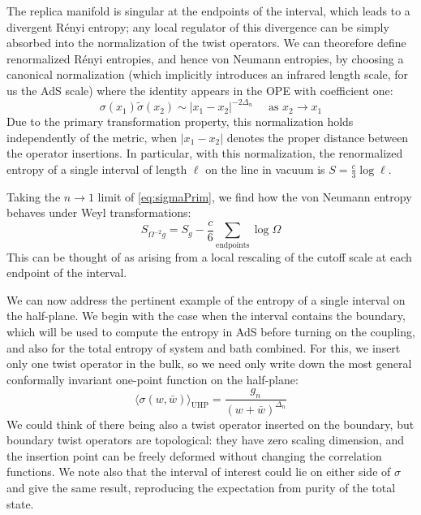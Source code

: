 \documentclass[12pt]{article}
\begin{document}
The replica manifold is singular at the endpoints of the interval, which leads to a divergent R\'enyi entropy; any local regulator of this divergence can be simply absorbed into the normalization of the twist operators. We can theorefore define renormalized R\'enyi entropies, and hence von Neumann entropies, by choosing a canonical normalization (which implicitly introduces an infrared length scale, for us the AdS scale) where the identity appears in the OPE with coefficient one:
\begin{equation}
	\sigma(x_1)\tilde{\sigma}(x_2)\sim |x_1-x_2|^{-2\Delta_n} \quad\text{ as } x_2\to x_1
\end{equation}
Due to the primary transformation property, this normalization holds independently of the metric, when $|x_1-x_2|$ denotes the proper distance between the operator insertions. In particular, with this normalization, the renormalized entropy of a single interval of length $\ell$ on the line in vacuum is $S=\frac{c}{3}\log \ell$.

Taking the $n\to 1$ limit of \eqref{eq:sigmaPrim}, we find how the von Neumann entropy behaves under Weyl transformations:
\begin{equation}\label{eq:SWeyl}
S_{\Omega^{-2}g} = S_g -\frac{c}{6} \sum_\text{endpoints} \log \Omega
\end{equation}
This can be thought of as arising from a local rescaling of the cutoff scale at each endpoint of the interval.


We can now address the pertinent example of the entropy of a single interval on the half-plane. We begin with the case when the interval contains the boundary, which will be used to compute the entropy in AdS before turning on the coupling, and also for the total entropy of system and bath combined. For this, we insert only one twist operator in the bulk, so we need only write down the most general conformally invariant one-point function on the half-plane:
\begin{equation}
	\langle \sigma(w,\bar{w})\rangle_\text{UHP} = \frac{g_n}{(w+\bar{w})^{\Delta_n}}
\end{equation}
We could think of there being also a twist operator inserted on the boundary, but boundary twist operators are topological: they have zero scaling dimension, and the insertion point can be freely deformed without changing the correlation functions. We note also that the interval of interest could lie on either side of $\sigma$ and give the same result, reproducing the expectation from purity of the total state.
\end{document}
